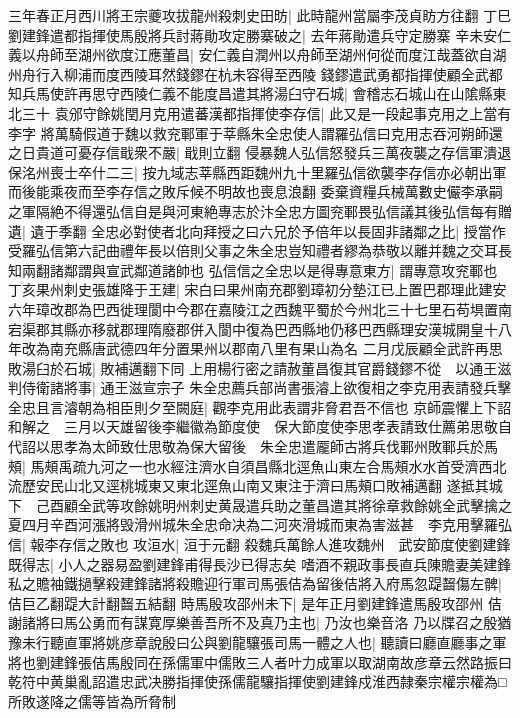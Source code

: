三年春正月西川將王宗夔攻拔龍州殺刺史田昉|{
	此時龍州當屬李茂貞眆方往翻}
丁巳劉建鋒遣都指揮使馬殷將兵討蔣勛攻定勝寨破之|{
	去年蔣勛遣兵守定勝寨}
辛未安仁義以舟師至湖州欲度江應董昌|{
	安仁義自潤州以舟師至湖州何從而度江哉蓋欲自湖州舟行入柳浦而度西陵耳然錢鏐在杭未容得至西陵}
錢鏐遣武勇都指揮使顧全武都知兵馬使許再思守西陵仁義不能度昌遣其將湯臼守石城|{
	會稽志石城山在山隂縣東北三十}
袁邠守餘姚閏月克用遣蕃漢都指揮使李存信|{
	此又是一段起事克用之上當有李字}
將萬騎假道于魏以救兖鄆軍于莘縣朱全忠使人謂羅弘信曰克用志吞河朔師還之日貴道可憂存信戢衆不嚴|{
	戢則立翻}
侵暴魏人弘信怒發兵三萬夜襲之存信軍潰退保洺州喪士卒什二三|{
	按九域志莘縣西距魏州九十里羅弘信欲襲李存信亦必朝出軍而後能乘夜而至李存信之敗斥候不明故也喪息浪翻}
委棄資糧兵械萬數史儼李承嗣之軍隔絶不得還弘信自是與河東絶專志於汴全忠方圖兖鄆畏弘信議其後弘信每有贈遺|{
	遺于季翻}
全忠必對使者北向拜授之曰六兄於予倍年以長固非諸鄰之比|{
	授當作受羅弘信第六記曲禮年長以倍則父事之朱全忠豈知禮者繆為恭敬以離并魏之交耳長知兩翻諸鄰謂與宣武鄰道諸帥也}
弘信信之全忠以是得專意東方|{
	謂專意攻兖鄆也}
丁亥果州刺史張雄降于王建|{
	宋白曰果州南充郡劉璋初分墊江已上置巴郡理此建安六年璋改郡為巴西徙理閬中今郡在嘉陵江之西魏平蜀於今州北三十七里石苟埧置南宕渠郡其縣亦移就郡理隋廢郡併入閬中復為巴西縣地仍移巴西縣理安漢城開皇十八年改為南充縣唐武德四年分置果州以郡南八里有果山為名}
二月戊辰顧全武許再思敗湯臼於石城|{
	敗補邁翻下同}
上用楊行密之請赦董昌復其官爵錢鏐不從　以通王滋判侍衛諸將事|{
	通王滋宣宗子}
朱全忠薦兵部尚書張濬上欲復相之李克用表請發兵擊全忠且言濬朝為相臣則夕至闕庭|{
	觀李克用此表謂非脅君吾不信也}
京師震懼上下詔和解之　三月以天雄留後李繼徽為節度使　保大節度使李思孝表請致仕薦弟思敬自代詔以思孝為太師致仕思敬為保大留後　朱全忠遣龎師古將兵伐鄆州敗鄆兵於馬頰|{
	馬頰禹疏九河之一也水經注濟水自須昌縣北逕魚山東左合馬頰水水首受濟西北流歷安民山北又逕桃城東又東北逕魚山南又東注于濟曰馬頰口敗補邁翻}
遂抵其城下　己酉顧全武等攻餘姚明州刺史黄晟遣兵助之董昌遣其將徐章救餘姚全武擊擒之　夏四月辛酉河漲將毁滑州城朱全忠命决為二河夾滑城而東為害滋甚　李克用擊羅弘信|{
	報李存信之敗也}
攻洹水|{
	洹于元翻}
殺魏兵萬餘人進攻魏州　武安節度使劉建鋒既得志|{
	小人之器易盈劉建鋒甫得長沙已得志矣}
嗜酒不親政事長直兵陳贍妻美建鋒私之贍袖鐵撾擊殺建鋒諸將殺贍迎行軍司馬張佶為留後佶將入府馬忽踶齧傷左髀|{
	佶巨乙翻踶大計翻齧五結翻}
時馬殷攻邵州未下|{
	是年正月劉建鋒遣馬殷攻邵州}
佶謝諸將曰馬公勇而有謀寛厚樂善吾所不及真乃主也|{
	乃汝也樂音洛}
乃以牒召之殷猶豫未行聽直軍將姚彦章說殷曰公與劉龍驤張司馬一體之人也|{
	聽讀曰廳直廳事之軍將也劉建鋒張佶馬殷同在孫儒軍中儒敗三人者叶力成軍以取湖南故彦章云然路振曰乾符中黄巢亂詔遣忠武决勝指揮使孫儒龍驤指揮使劉建鋒戍淮西隷秦宗權宗權為□所敗遂降之儒等皆為所脅制}
